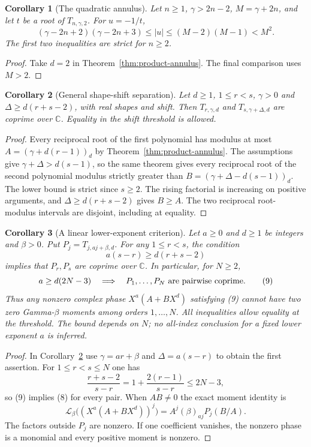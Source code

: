 \documentclass[11pt]{article}
\newtheorem{corollary}{Corollary}
\begin{document}
\begin{corollary}[The quadratic annulus]\label{cor:quadratic-annulus}
Let $n\ge1$, $\gamma>2n-2$, $M=\gamma+2n$, and let $t$ be a root
of $T_{n,\gamma,2}$.  For $u=-1/t$,
\[
 (\gamma-2n+2)(\gamma-2n+3)
 \le |u|\le(M-2)(M-1)<M^2.                                  \tag{7}
\]
The first two inequalities are strict for $n\ge2$.
\end{corollary}
\begin{proof}
Take $d=2$ in Theorem~\ref{thm:product-annulus}.
The final comparison uses $M>2$.
\end{proof}

\begin{corollary}[General shape-shift separation]\label{cor:shape-shift-separation}
Let $d\ge1$, $1\le r<s$, $\gamma>0$ and
$\Delta\ge d(r+s-2)$, with real shapes and shift.
Then $T_{r,\gamma,d}$ and $T_{s,\gamma+\Delta,d}$
are coprime over $\mathbb C$.
Equality in the shift threshold is allowed.
\end{corollary}
\begin{proof}
Every reciprocal root of the first polynomial has modulus at most
$A=(\gamma+d(r-1))_d$ by Theorem~\ref{thm:product-annulus}.
The assumptions give
$\gamma+\Delta>d(s-1)$, so the same theorem gives every
reciprocal root of the second polynomial modulus strictly greater than
$B=(\gamma+\Delta-d(s-1))_d$.
The lower bound is strict since $s\ge2$.
The rising factorial is increasing on positive arguments, and
$\Delta\ge d(r+s-2)$ gives $B\ge A$.  The two reciprocal
root-modulus intervals are disjoint, including at equality.
\end{proof}

\begin{corollary}[A linear lower-exponent criterion]\label{cor:linear-lower-exponent}
Let $a\ge0$ and $d\ge1$ be integers and $\beta>0$.  Put
$P_j=T_{j,aj+\beta,d}$.
For any $1\le r<s$, the condition
\[
 a(s-r)\ge d(r+s-2)                                      \tag{8}
\]
implies that $P_r,P_s$ are coprime over $\mathbb C$.
In particular, for $N\ge2$,
\[
 a\ge d(2N-3)\quad\Longrightarrow\quad
             P_1,\ldots,P_N\ \hbox{are pairwise coprime}.       \tag{9}
\]
Thus any nonzero complex phase $X^a(A+BX^d)$ satisfying (9)
cannot have two zero Gamma-$\beta$ moments among orders $1,\ldots,N$.
All inequalities allow equality at the threshold.
The bound depends on $N$; no all-index conclusion for a fixed
lower exponent $a$ is inferred.
\end{corollary}
\begin{proof}
In Corollary~\ref{cor:shape-shift-separation} use
$\gamma=ar+\beta$ and $\Delta=a(s-r)$ to obtain the first assertion.
For $1\le r<s\le N$ one has
\[
 \frac{r+s-2}{s-r}
 =1+\frac{2(r-1)}{s-r}\le2N-3,
\]
so (9) implies (8) for every pair.
When $AB\ne0$ the exact moment identity is
\[
 \mathcal L_\beta\bigl((X^a(A+BX^d))^j\bigr)
       =A^j(\beta)_{aj}P_j(B/A).
\]
The factors outside $P_j$ are nonzero. If one coefficient
vanishes, the nonzero phase is a monomial and every positive
moment is nonzero.
\end{proof}
\end{document}
